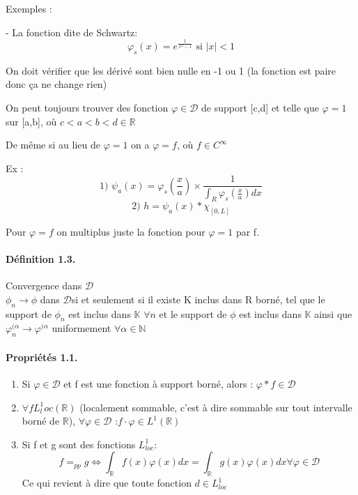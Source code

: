 \documentclass[12pt,a4paper]{report}
\newcommand{\D}{\ensuremath{\mathcal{D}}}
\begin{document}
Exemples : \par
- La fonction dite de Schwartz:
\[
	\varphi_s (x) = e^{\frac{1}{x^2-1} }\text{ si } \vert x \vert < 1
\]

On doit vérifier que les dérivé sont bien nulle en -1 ou 1 (la fonction est paire donc ça ne change rien)

On peut toujours trouver des fonction \(\varphi \in \D\) de support [c,d] et telle que \(\varphi = 1\) sur [a,b], où \(c < a < b < d \in \mathbb{R}\)

De même si au lieu de \(\varphi = 1\) on a \(\varphi = f\), où \(f \in C^{\infty}\)

Ex :  \[\text{1) } \psi_a (x) = \varphi_s \left(\frac{x}{a}\right) \times \frac{1}{\int_R \varphi_s \left(\frac{x}{a}\right) dx}\]
\[
	\text{2) }h = \psi_a (x) * \chi_{[0,L]}
\]

Pour \(\varphi = f\) on multiplus juste la fonction pour \(\varphi = 1\) par f.

\paragraph{Définition 1.3.} Convergence dans \(\D\)\\
\(\phi_n \rightarrow \phi\) dans \D si et seulement si il existe K inclus dans R borné, tel que le support de \(\phi_n\) est inclus dans \(\mathbb{K}\) \(\forall n\) et le support de \(\phi\) est inclus dans \(\mathbb{K}\) ainsi que \(\varphi_n^{(\alpha} \rightarrow \varphi^{(\alpha}\) uniformement \(\forall \alpha \in \mathbb{N}\)

\paragraph{Propriétés 1.1.}
\begin{enumerate}
	\item Si \(\varphi \in \D\) et f est une fonction à support borné, alors : \(\varphi * f \in \D\)
	\item \(\forall f L^1_loc(\mathbb{R})\) (localement sommable, c'est à dire sommable sur tout intervalle borné de \(\mathbb{R}\)), \(\forall \varphi \in \D\) :\quad \(f\cdot \varphi \in L^1(\mathbb{R})\)
	\item Si f et g sont des fonctions \(L^1_{loc}\):
	\[
		f =_{pp} g \Leftrightarrow \int_{\mathbb{R}} f(x) \varphi(x) dx = \int_{\mathbb{R}} g(x)  \varphi(x) dx \forall \varphi \in \D
	\]
	Ce qui revient à dire que toute fonction \(d \in L^1_{loc}\)
\end{enumerate}
\end{document}
